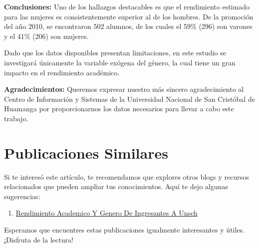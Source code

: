 \documentclass[
  jou,
  floatsintext,
  longtable,
  a4paper,
  nolmodern,
  notxfonts,
  notimes,
  12pt,
  colorlinks=true,linkcolor=blue,citecolor=blue,urlcolor=blue]{apa7}
\providecommand{\tightlist}{%
  \setlength{\itemsep}{0pt}\setlength{\parskip}{0pt}}
\begin{document}
\textbf{Conclusiones:} Uno de los hallazgos destacables es que el
rendimiento estimado para las mujeres es consistentemente superior al de
los hombres. De la promoción del año 2010, se encontraron 502 alumnos,
de los cuales el 59\% (296) son varones y el 41\% (206) son mujeres.

Dado que los datos disponibles presentan limitaciones, en este estudio
se investigará únicamente la variable exógena del género, la cual tiene
un gran impacto en el rendimiento académico.

\textbf{Agradecimientos:} Queremos expresar nuestro más sincero
agradecimiento al Centro de Información y Sistemas de la Universidad
Nacional de San Cristóbal de Huamanga por proporcionarnos los datos
necesarios para llevar a cabo este trabajo.

\section{Publicaciones Similares}\label{publicaciones-similares}

Si te interesó este artículo, te recomendamos que explores otros blogs y
recursos relacionados que pueden ampliar tus conocimientos. Aquí te dejo
algunas sugerencias:

\begin{enumerate}
\def\labelenumi{\arabic{enumi}.}
\tightlist
\item
  \href{https://epsilon-y-beta.netlify.app/estadistica-para-economistas/2019-12-30-rendimiento-academico-y-genero-de-ingresantes-a-unsch/index.pdf}{}
  \href{https://epsilon-y-beta.netlify.app/estadistica-para-economistas/2019-12-30-rendimiento-academico-y-genero-de-ingresantes-a-unsch}{Rendimiento
  Academico Y Genero De Ingresantes A Unsch}
\end{enumerate}

Esperamos que encuentres estas publicaciones igualmente interesantes y
útiles. ¡Disfruta de la lectura!
\end{document}
